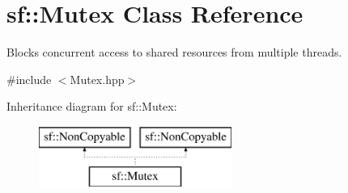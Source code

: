 \hypertarget{classsf_1_1_mutex}{\section{sf\-:\-:Mutex Class Reference}
\label{classsf_1_1_mutex}
}


Blocks concurrent access to shared resources from multiple threads.  




{\ttfamily \#include $<$Mutex.\-hpp$>$}

Inheritance diagram for sf\-:\-:Mutex\-:\begin{figure}[H]
\begin{center}
\leavevmode
\includegraphics[height=2.000000cm]{classsf_1_1_mutex}
\end{center}
\end{figure}
